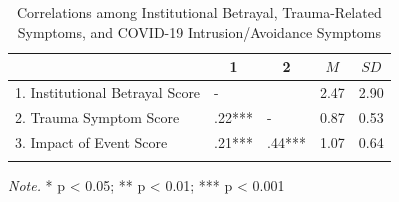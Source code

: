 \documentclass[
  english,
  man, noextraspace]{apa6}
\begin{document}
\begin{table}[tbp]

\begin{center}
\begin{threeparttable}

\caption{\label{tab:table1}Correlations among Institutional Betrayal, Trauma-Related Symptoms, and COVID-19 Intrusion/Avoidance Symptoms}

\begin{tabular}{lllll}
\toprule
 & \multicolumn{1}{c}{1} & \multicolumn{1}{c}{2} & \multicolumn{1}{c}{$M$} & \multicolumn{1}{c}{$SD$}\\
\midrule
1. Institutional Betrayal Score & - &  & 2.47 & 2.90\\
2. Trauma Symptom Score & .22*** & - & 0.87 & 0.53\\
3. Impact of Event Score & .21*** & .44*** & 1.07 & 0.64\\
\bottomrule
\addlinespace
\end{tabular}

\begin{tablenotes}[para]
\normalsize{\textit{Note.} * p < 0.05; ** p < 0.01; *** p < 0.001}
\end{tablenotes}

\end{threeparttable}
\end{center}

\end{table}
\end{document}
